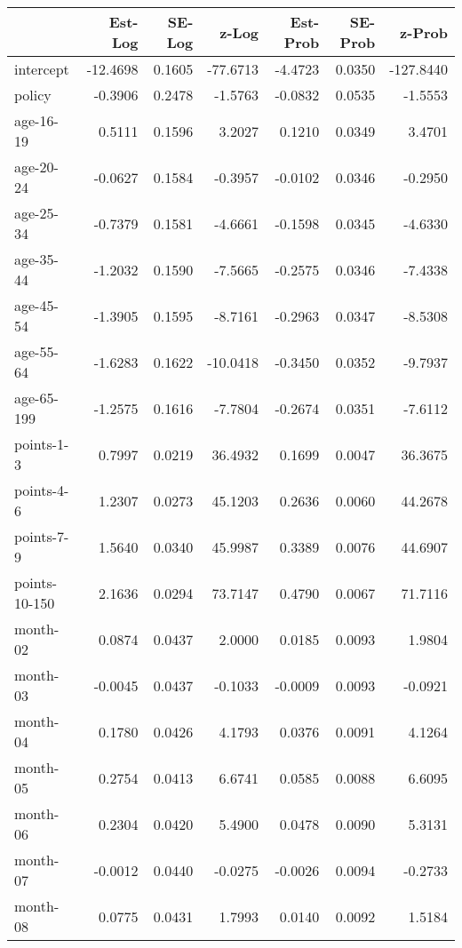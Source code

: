 \documentclass[10pt]{article}
\begin{document}

\begin{table}[ht]
\centering
\begin{tabular}{lrrrrrr}
  \hline
 & Est-Log & SE-Log & z-Log & Est-Prob & SE-Prob & z-Prob \\ 
  \hline
intercept & -12.4698 & 0.1605 & -77.6713 & -4.4723 & 0.0350 & -127.8440 \\ 
  policy & -0.3906 & 0.2478 & -1.5763 & -0.0832 & 0.0535 & -1.5553 \\ 
  age-16-19 & 0.5111 & 0.1596 & 3.2027 & 0.1210 & 0.0349 & 3.4701 \\ 
  age-20-24 & -0.0627 & 0.1584 & -0.3957 & -0.0102 & 0.0346 & -0.2950 \\ 
  age-25-34 & -0.7379 & 0.1581 & -4.6661 & -0.1598 & 0.0345 & -4.6330 \\ 
  age-35-44 & -1.2032 & 0.1590 & -7.5665 & -0.2575 & 0.0346 & -7.4338 \\ 
  age-45-54 & -1.3905 & 0.1595 & -8.7161 & -0.2963 & 0.0347 & -8.5308 \\ 
  age-55-64 & -1.6283 & 0.1622 & -10.0418 & -0.3450 & 0.0352 & -9.7937 \\ 
  age-65-199 & -1.2575 & 0.1616 & -7.7804 & -0.2674 & 0.0351 & -7.6112 \\ 
  points-1-3 & 0.7997 & 0.0219 & 36.4932 & 0.1699 & 0.0047 & 36.3675 \\ 
  points-4-6 & 1.2307 & 0.0273 & 45.1203 & 0.2636 & 0.0060 & 44.2678 \\ 
  points-7-9 & 1.5640 & 0.0340 & 45.9987 & 0.3389 & 0.0076 & 44.6907 \\ 
  points-10-150 & 2.1636 & 0.0294 & 73.7147 & 0.4790 & 0.0067 & 71.7116 \\ 
  month-02 & 0.0874 & 0.0437 & 2.0000 & 0.0185 & 0.0093 & 1.9804 \\ 
  month-03 & -0.0045 & 0.0437 & -0.1033 & -0.0009 & 0.0093 & -0.0921 \\ 
  month-04 & 0.1780 & 0.0426 & 4.1793 & 0.0376 & 0.0091 & 4.1264 \\ 
  month-05 & 0.2754 & 0.0413 & 6.6741 & 0.0585 & 0.0088 & 6.6095 \\ 
  month-06 & 0.2304 & 0.0420 & 5.4900 & 0.0478 & 0.0090 & 5.3131 \\ 
  month-07 & -0.0012 & 0.0440 & -0.0275 & -0.0026 & 0.0094 & -0.2733 \\ 
  month-08 & 0.0775 & 0.0431 & 1.7993 & 0.0140 & 0.0092 & 1.5184 \\ 

\end{tabular}
\end{table}
\end{document}
